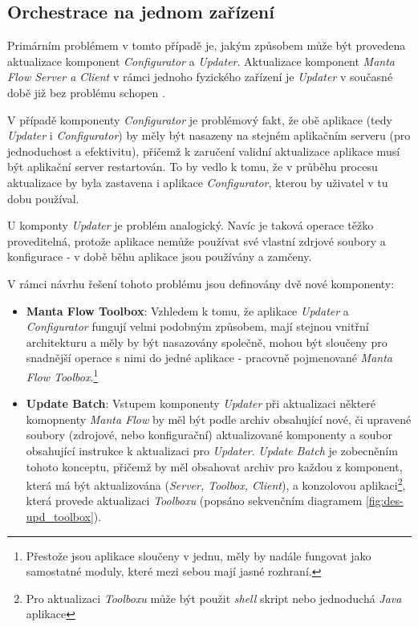 \subsection{Orchestrace na jednom zařízení}
\label{sec:des_orchestration_singlenode}
Primárním problémem v tomto případě je, jakým způsobem může být provedena aktualizace komponent \textit{Configurator} a \textit{Updater}. Aktualizace komponent \textit{Manta Flow Server a Client} v rámci jednoho fyzického zařízení je \textit{Updater} v současné době již bez problému schopen \cite{Gondek16}.

V případě komponenty \textit{Configurator} je problémový fakt, že obě aplikace (tedy \textit{Updater} i \textit{Configurator}) by měly být nasazeny na stejném aplikačním serveru (pro jednoduchost a efektivitu), přičemž k zaručení validní aktualizace aplikace musí být aplikační server restartován. To by vedlo k tomu, že v průběhu procesu aktualizace by byla zastavena i aplikace \textit{Configurator}, kterou by uživatel v tu dobu používal.

U komponty \textit{Updater} je problém analogický. Navíc je taková operace těžko proveditelná, protože aplikace nemůže používat své vlastní zdrjové soubory a konfigurace - v době běhu aplikace jsou používány a zamčeny.

V rámci návrhu řešení tohoto problému jsou definovány dvě nové komponenty:

\begin{itemize}
   \item{\textbf{Manta Flow Toolbox}}: Vzhledem k tomu, že aplikace \textit{Updater} a \textit{Configurator} fungují velmi podobným způsobem, mají stejnou vnitřní architekturu a měly by být nasazovány společně, mohou být sloučeny pro snadnější operace s nimi do jedné aplikace - pracovně pojmenované \textit{Manta Flow Toolbox}.\footnote{Přestože jsou aplikace sloučeny v jednu, měly by nadále fungovat jako samostatné moduly, které mezi sebou mají jasné rozhraní.}
   \item{\textbf{Update Batch}}: Vstupem komponenty \textit{Updater} při aktualizaci některé komopnenty \textit{Manta Flow} by měl být podle \cite{Gondek16} archiv obsahující nové, či upravené soubory (zdrojové, nebo konfigurační) aktualizované komponenty a soubor obsahující instrukce k aktualizaci pro \textit{Updater}. \textit{Update Batch} je zobecněním tohoto konceptu, přičemž by měl obsahovat archiv pro každou z komponent, která má být aktualizována (\textit{Server, Toolbox, Client}), a konzolovou aplikaci\footnote{Pro aktualizaci \textit{Toolboxu} může být použit \textit{shell} skript nebo jednoduchá \textit{Java} aplikace}, která provede aktualizaci \textit{Toolboxu} (popsáno sekvenčním diagramem \ref{fig:des-upd_toolbox}).
\end{itemize}


